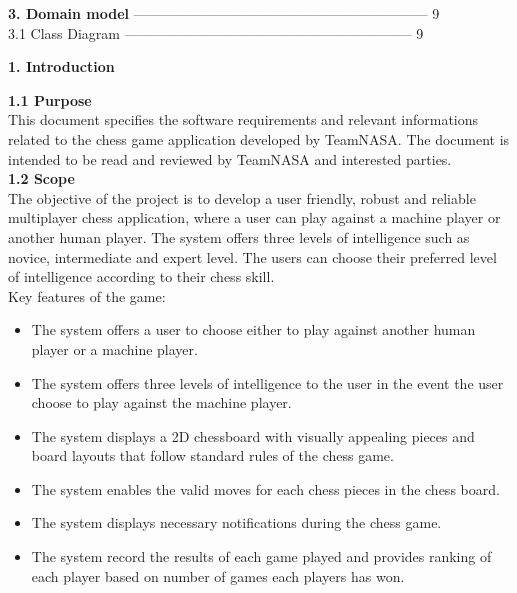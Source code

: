 \documentclass{article}
\begin{document}
\begin{flushleft}
\textbf{3.	Domain model}  --------------------------------------------------------------- 9\\
3.1 \hspace{0.5cm}Class Diagram  --------------------------------------------------------------	9\\

\newpage

\begin{Large}\textbf{1.	Introduction}\\
\end{Large}
\vspace{3mm}
\textbf{1.1	Purpose}\\
\vspace{1mm}
This document specifies the software requirements and relevant informations related to the chess game application developed by TeamNASA. The document is intended to be read and reviewed by TeamNASA and interested parties.\\
\vspace{5mm}
\textbf{1.2	Scope}\\
\vspace{1mm}
The objective of the project is to develop a user friendly, robust and reliable multiplayer chess application, where a user can play against a machine player or another human player. The system offers three levels of intelligence such as novice, intermediate and expert level. The users can choose their preferred level of intelligence according to their chess skill.\\
\vspace{1mm}
Key features of the game:
\begin{itemize}
	

\item The system offers a user to choose either to play against another human player or a machine player.
\item The system offers three levels of intelligence to the user in the event the user choose to play against the machine player.
\item The system displays a 2D chessboard with visually appealing pieces and board layouts that follow standard rules of the chess game.
\item The system enables the valid moves for each chess pieces in the chess board.
\item The system displays necessary notifications during the chess game.   
\item The system record the results of each game played and provides ranking of each player based on number of games each players has won.



\end{itemize}
\end{flushleft}
\end{document}
